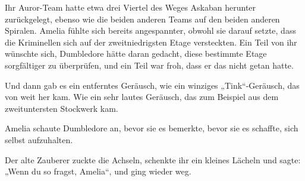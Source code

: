 \later

Ihr Auror-Team hatte etwa drei Viertel des Weges Askaban herunter zurückgelegt, ebenso wie die beiden anderen Teams auf den beiden anderen Spiralen. Amelia fühlte sich bereits angespannter, obwohl sie darauf setzte, dass die Kriminellen sich auf der zweitniedrigsten Etage versteckten. Ein Teil von ihr wünschte sich, Dumbledore hätte daran gedacht, diese bestimmte Etage sorgfältiger zu überprüfen, und ein Teil war froh, dass er das nicht getan hatte.

Und dann gab es ein entferntes Geräusch, wie ein winziges „Tink“-Geräusch, das von weit her kam. Wie ein sehr lautes Geräusch, das zum Beispiel aus dem zweituntersten Stockwerk kam.

Amelia schaute Dumbledore an, bevor sie es bemerkte, bevor sie es schaffte, sich selbst aufzuhalten.

Der alte Zauberer zuckte die Achseln, schenkte ihr ein kleines Lächeln und sagte: „Wenn du so fragst, Amelia“, und ging wieder weg.

\later

